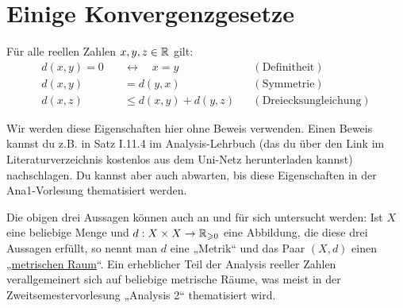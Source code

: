 \section{Einige Konvergenzgesetze}


\begin{sat}
 Für alle reellen Zahlen $x,y,z \in {\mathbb R}$ gilt:
 \begin{align*}
  d(x,y)=0 \quad &\leftrightarrow\quad x=y && (\text{Definitheit}) \\
  d(x,y) & = d(y,x) && (\text{Symmetrie}) \\
  d(x,z) & \leq d(x,y)+d(y,z) && (\text{Dreiecksungleichung})
 \end{align*}
\end{sat}
\begin{bew}
 Wir werden diese Eigenschaften hier ohne Beweis verwenden. Einen Beweis kannst du z.B. in Satz I.11.4 im Analysis-Lehrbuch \citet{AE06} (das du über den Link im Literaturverzeichnis kostenlos aus dem Uni-Netz herunterladen kannst) nachschlagen. Du kannst aber auch abwarten, bis diese Eigenschaften in der Ana1-Vorlesung thematisiert werden.
\end{bew}



\begin{bem}
 Die obigen drei Aussagen können auch an und für sich untersucht werden: Ist $X$ eine beliebige Menge und $d:X\times X\to {\mathbb R}_{\geqslant 0}$ eine Abbildung, die diese drei Aussagen erfüllt, so nennt man $d$ eine „Metrik“ und das Paar $(X,d)$ einen „\href{https://de.wikipedia.org/wiki/Metrischer_Raum}{metrischen Raum}“. Ein erheblicher Teil der Analysis reeller Zahlen verallgemeinert sich auf beliebige metrische Räume, was meist in der Zweitsemestervorlesung „Analysis 2“ thematisiert wird.
\end{bem}




